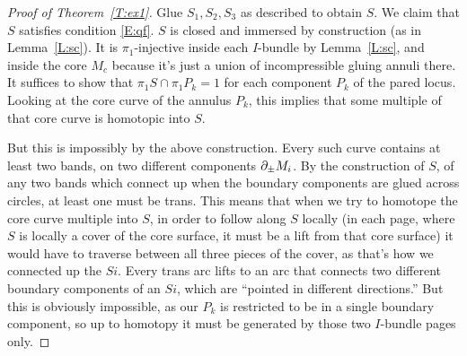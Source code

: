 \begin{proof}[Proof of Theorem~\ref{T:ex1}]
Glue $S_1,S_2,S_3$ as described to obtain $S$. We claim that $S$ satisfies
condition \eqref{E:qf}. $S$ is closed and immersed by construction (as in
Lemma~\ref{L:sc}). It is $\pi_1$-injective inside each $I$-bundle by
Lemma~\ref{L:sc}, and inside the core $M_c$ because it's just a union of
incompressible gluing annuli there. It suffices to show that $\pi_1S \cap
\pi_1P_k = 1$ for each component $P_k$ of the pared locus. Looking at the core
curve of the annulus $P_k$, this implies that some multiple of that core curve
is homotopic into $S$.

But this is impossibly by the above construction. Every such curve contains at
least two bands, on two different components $\partial_\pm M_i$. By the construction
of $S$, of any two bands which connect up when the boundary components are
glued across circles, at least one must be trans. This means that when we try
to homotope the core curve multiple into $S$, in order to follow along $S$
locally (in each page, where $S$ is locally a cover of the core surface, it
must be a lift from that core surface) it would have to traverse between all
three pieces of the cover, as that's how we connected up the $Si$. Every trans
arc lifts to an arc that connects two different boundary components of an $Si$,
which are ``pointed in different directions.'' But this is obviously
impossible, as our $P_k$ is restricted to be in a single boundary component, so
up to homotopy it must be generated by those two $I$-bundle pages only.

\end{proof}

